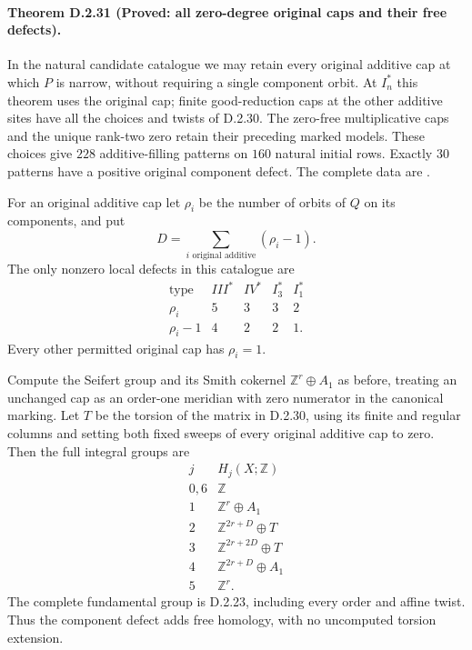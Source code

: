 \paragraph{Theorem D.2.31 (Proved: all zero-degree original caps and their free defects).}
In the natural candidate catalogue we may retain every original
additive cap at which $P$ is narrow, without requiring a single
component orbit. At $I_n^*$ this theorem uses the original cap;
finite good-reduction caps at the other additive sites have all
the choices and twists of D.2.30. The zero-free multiplicative
caps and the unique rank-two zero retain their preceding marked
models. These choices give $228$ additive-filling patterns on
$160$ natural initial rows. Exactly $30$ patterns have a positive
original component defect. The complete data are
.

For an original additive cap let $\rho_i$ be the number of
orbits of $Q$ on its components, and put
\[
 D=\sum_{i\text{ original additive}}(\rho_i-1).
\]
The only nonzero local defects in this catalogue are
\[
\begin{array}{c|rrrr}
\text{type}&III^*&IV^*&I_3^*&I_1^*\\\hline
\rho_i&5&3&3&2\\
\rho_i-1&4&2&2&1.
\end{array}                                                   \tag{D.OD1}
\]
Every other permitted original cap has $\rho_i=1$.

Compute the Seifert group and its Smith cokernel
$\mathbb Z^r\oplus A_1$ as before, treating an unchanged cap
as an order-one meridian with zero numerator in the canonical
marking. Let $T$ be the torsion of the matrix in D.2.30,
using its finite and regular columns and setting both fixed
sweeps of every original additive cap to zero. Then the full
integral groups are
\[
\begin{array}{c|c}
j&H_j(X;\mathbb Z)\\\hline
0,6&\mathbb Z\\
1&\mathbb Z^r\oplus A_1\\
2&\mathbb Z^{2r+D}\oplus T\\
3&\mathbb Z^{2r+2D}\oplus T\\
4&\mathbb Z^{2r+D}\oplus A_1\\
5&\mathbb Z^r.
\end{array}                                                   \tag{D.OD2}
\]
The complete fundamental group is D.2.23, including every
order and affine twist. Thus the component defect adds free
homology, with no uncomputed torsion extension.

